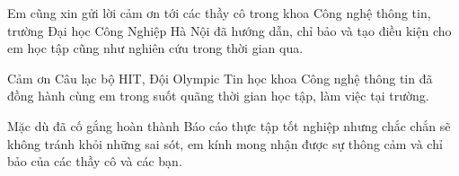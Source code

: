 Em cũng xin gửi lời cảm ơn tới các thầy cô trong khoa Công nghệ thông tin,
trường Đại học Công Nghiệp Hà Nội đã hướng dẫn, chỉ bảo và tạo điều kiện cho em
học tập cũng như nghiên cứu trong thời gian qua.

Cảm ơn Câu lạc bộ HIT, Đội Olympic Tin học khoa Công nghệ thông tin đã đồng hành
cùng em trong suốt quãng thời gian học tập, làm việc tại trường.

Mặc dù đã cố gắng hoàn thành Báo cáo thực tập tốt nghiệp nhưng chắc chắn
sẽ không tránh khỏi những sai sót, em kính mong nhận được sự thông cảm và chỉ
bảo của các thầy cô và các bạn.


